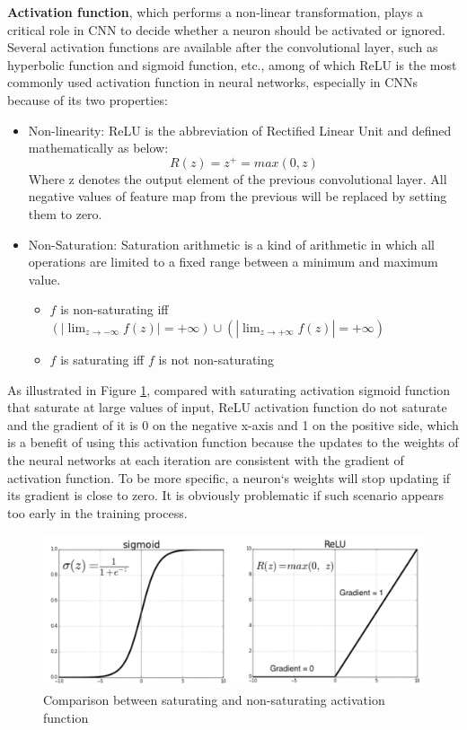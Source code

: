 \documentclass[]{krantz}
\providecommand{\tightlist}{%
  \setlength{\itemsep}{0pt}\setlength{\parskip}{0pt}}
\begin{document}
\textbf{Activation function}, which performs a non-linear transformation, plays a critical role in CNN to decide whether a neuron should be activated or ignored. Several activation functions are available after the convolutional layer, such as hyperbolic function and sigmoid function, etc., among of which ReLU is the most commonly used activation function in neural networks, especially in CNNs\citep{Krizhevsky2012ImageNetCW} because of its two properties:

\begin{itemize}
\item
  Non-linearity: ReLU is the abbreviation of Rectified Linear Unit and defined mathematically as below:
  \[ R(z)=z^{+}= max(0,z)\]
  Where z denotes the output element of the previous convolutional layer. All negative values of feature map from the previous will be replaced by setting them to zero.
\item
  Non-Saturation: Saturation arithmetic is a kind of arithmetic in which all operations are limited to a fixed range between a minimum and maximum value.

  \begin{itemize}
  \tightlist
  \item
    \(f\) is non-saturating iff \((|\displaystyle{\lim_{z \to -\infty}f(z)}|=+\infty) \cup (|\displaystyle{\lim_{z \to +\infty}f(z)}|=+\infty)\)
  \item
    \(f\) is saturating iff \(f\) is not non-saturating
  \end{itemize}
\end{itemize}

As illustrated in Figure \ref{fig:figs-3}, compared with saturating activation sigmoid function that saturate at large values of input, ReLU activation function do not saturate\citep{Krizhevsky2012ImageNetCW} and the gradient of it is 0 on the negative x-axis and 1 on the positive side, which is a benefit of using this activation function because the updates to the weights of the neural networks at each iteration are consistent with the gradient of activation function. To be more specific, a neuron`s weights will stop updating if its gradient is close to zero. It is obviously problematic if such scenario appears too early in the training process.

\begin{figure}[ht]

{\centering \includegraphics[width=0.6\linewidth]{figures/01-03-cnns-and-their-applications-in-nlp/ReLU_sigmoid} 

}

\caption{Comparison between saturating and non-saturating activation function }\label{fig:figs-3}
\end{figure}
\end{document}
